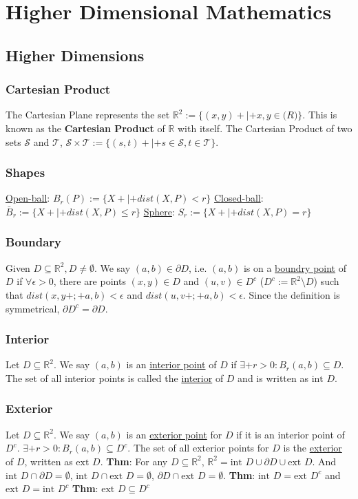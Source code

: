 \section{Higher Dimensional Mathematics}

\subsection{Higher Dimensions}
\subsubsection{Cartesian Product}
The Cartesian Plane represents the set $\mathbb{R}^2 := \{(x, y)+|+x, y\in \mathbb(R)\}$. This is known as the \textbf{Cartesian Product} of $\mathbb{R}$ with
itself. The Cartesian Product of two sets $\mathcal{S}$ and $\mathcal{T}$,
$\mathcal{S} \times \mathcal{T} :=  \{(s, t)+|+s\in\mathcal{S},
t\in\mathcal{T}\}$.

\subsubsection{Shapes}
\underline{Open-ball}:
$B_r(P) := \{X+|+dist(X, P) < r\}$
\underline{Closed-ball}:
$\bar{B}_r := \{X+|+ dist(X, P) \leq r\}$
\underline{Sphere}:
$S_r := \{X+|+dist(X, P) = r\}$

\subsubsection{Boundary}
Given $D \subseteq \mathbb{R}^2, D \neq \emptyset$. We say $(a, b) \in
\partial D$, i.e. $(a, b)$ is on a \underline{boundry point} of $D$ if $\forall
\epsilon > 0$, there are points $(x, y)\in D$ and $(u, v) \in D^c$ ($D^c :=
\mathbb{R}^2 \setminus D$) such that $dist(x, y+;+ a, b) < \epsilon$ and
$dist(u, v+;+ a, b) < \epsilon$. Since the definition is symmetrical, $\partial D^c = \partial D$.

\subsubsection{Interior}
Let $D \subseteq \mathbb{R}^2$. We say $(a, b)$ is an
\underline{interior point} of $D$ if $\exists+ r > 0:B_r(a, b)\subseteq D$.
The set of all interior points is called the \underline{interior} of $D$ and is
written as $\text{int } D$.

\subsubsection{Exterior}
Let $D \subseteq \mathbb{R}^2$. We say $(a, b)$ is an
\underline{exterior point} for $D$ if it is an interior point of $D^c$.
$\exists+ r > 0: B_r(a, b) \subseteq D^c$.
The set of all exterior points for $D$ is the \underline{exterior} of $D$,
written as $\text{ext } D$.
\textbf{Thm}: For any $D \subseteq \mathbb{R}^2$, $\mathbb{R}^2 =
\text{int } D \cup \partial D \cup \text{ext } D$. And $\text{int } D \cap
\partial D = \emptyset$, $\text{int } D \cap \text{ext } D = \emptyset$,
$\partial D \cap \text{ext } D = \emptyset$.
\textbf{Thm}: $\text{int } D = \text{ext } D^c$ and $\text{ext } D =
\text{int } D^c$
\textbf{Thm}: $\text{ext } D \subseteq D^c$

